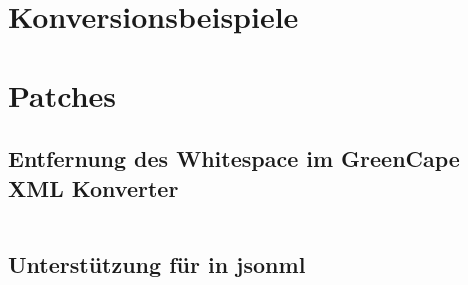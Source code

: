 \chapter{Konversionsbeispiele}
\label{appx:convexamples}


\chapter{Patches}
\label{appx:patches}

\section{Entfernung des Whitespace im GreenCape XML Konverter}
\label{appx:greencapexml}

\inputminted[breakautoindent=false]{udiff}{patches/greencapexml-noindent.patch}

\section{Unterstützung für  in \acrshort{jsonml}}
\label{appx:jsonmlpi}

\inputminted[breakautoindent=false]{udiff}{patches/jsonml-pi.patch}

